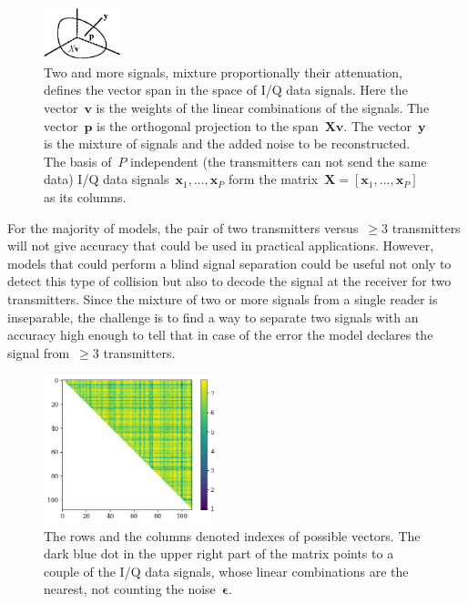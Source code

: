 \documentclass[12pt]{article}
\newcommand{\bx}{\mathbf{x}}
\begin{document}
\newcommand{\bX}{\mathbf{X}}
\newcommand{\bv}{\mathbf{v}}
\newcommand{\bp}{\mathbf{p}}
\newcommand{\by}{\mathbf{y}}
\newcommand{\beps}{\boldsymbol{\epsilon}}

\begin{figure}[!t]
\centering
\includegraphics[width=0.2\textwidth]{fig_LeastSquaresProjection}
\caption{Two and more signals, mixture proportionally their attenuation, defines the vector span in the space of I/Q data signals. Here the vector~$\bv$ is the weights of the linear combinations of the signals. The vector~$\bp$ is the orthogonal projection to the span~$\bX\bv$. The vector~$\by$ is the mixture of signals and the added noise to be reconstructed. The basis of~$P$ independent (the transmitters can not send the same data) I/Q data 
signals~$\bx_1,\ldots,\bx_P$ form the matrix~$\bX=[\bx_1,\ldots,\bx_P]$ as its columns.}
\label{fig:demo}
\end{figure}

For the majority of models, the pair of two transmitters versus~$\geq 3$ transmitters will not give accuracy that could be used in practical applications. However, models that could perform a blind signal separation could be useful not only to detect this type of collision but also to decode the signal at the receiver for two transmitters. Since the mixture of two or more signals from a single reader is inseparable, the challenge is to find a way to separate two signals with an accuracy high enough to tell that in case of the error the model declares the signal from~$\geq 3$ transmitters.

\begin{figure}[!bp]
\centering
\includegraphics[width=0.45\textwidth]{fig_pairwise_separation}
\caption{The rows and the columns denoted indexes of possible vectors. The dark blue dot in the upper right part of the matrix points to a couple of the I/Q data signals, whose linear combinations are the nearest, not counting the noise~$\beps$.}
\label{fig:demo}
\end{figure}
\end{document}
